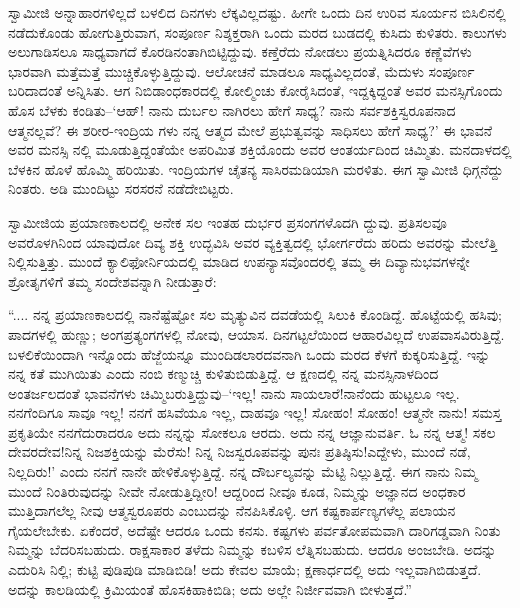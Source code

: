 ಸ್ವಾಮೀಜಿ ಅನ್ನಾಹಾರಗಳಿಲ್ಲದೆ ಬಳಲಿದ ದಿನಗಳು ಲೆಕ್ಕವಿಲ್ಲದಷ್ಟು. ಹೀಗೇ ಒಂದು ದಿನ ಉರಿವ ಸೂರ್ಯನ ಬಿಸಿಲಿನಲ್ಲಿ ನಡೆದುಕೊಂಡು ಹೋಗುತ್ತಿರುವಾಗ, ಸಂಪೂರ್ಣ ನಿಶ್ಶಕ್ತರಾಗಿ ಒಂದು ಮರದ ಬುಡದಲ್ಲಿ ಕುಸಿದು ಕುಳಿತರು. ಕಾಲುಗಳು ಅಲುಗಾಡಿಸಲೂ ಸಾಧ್ಯವಾಗದೆ ಕೊರಡಿನಂತಾಗಿಬಿಟ್ಟಿದ್ದುವು. ಕಣ್ತೆರೆದು ನೋಡಲು ಪ್ರಯತ್ನಿಸಿದರೂ ಕಣ್ಣೆವೆಗಳು ಭಾರವಾಗಿ ಮತ್ತೆಮತ್ತೆ ಮುಚ್ಚಿಕೊಳ್ಳುತ್ತಿದ್ದುವು. ಆಲೋಚನೆ ಮಾಡಲೂ ಸಾಧ್ಯವಿಲ್ಲದಂತೆ, ಮೆದುಳು ಸಂಪೂರ್ಣ ಬರಿದಾದಂತೆ ಅನ್ನಿಸಿತು. ಆಗ ನಿಬಿಡಾಂಧಕಾರದಲ್ಲಿ ಕೋಲ್ಮಿಂಚು ಕೋರೈಸಿದಂತೆ, ಇದ್ದಕ್ಕಿದ್ದಂತೆ ಅವರ ಮನಸ್ಸಿಗೊಂದು ಹೊಸ ಬೆಳಕು ಕಂಡಿತು–‘ಆಹ್! ನಾನು ದುರ್ಬಲ ನಾಗಿರಲು ಹೇಗೆ ಸಾಧ್ಯ? ನಾನು ಸರ್ವಶಕ್ತಿಸ್ವರೂಪನಾದ ಆತ್ಮನಲ್ಲವೆ? ಈ ಶರೀರ-ಇಂದ್ರಿಯ ಗಳು ನನ್ನ ಆತ್ಮದ ಮೇಲೆ ಪ್ರಭುತ್ವವನ್ನು ಸಾಧಿಸಲು ಹೇಗೆ ಸಾಧ್ಯ?’ ಈ ಭಾವನೆ ಅವರ ಮನಸ್ಸಿ ನಲ್ಲಿ ಮೂಡುತ್ತಿದ್ದಂತೆಯೇ ಅಪರಿಮಿತ ಶಕ್ತಿಯೊಂದು ಅವರ ಆಂತರ್ಯದಿಂದ ಚಿಮ್ಮಿತು. ಮನದಾಳದಲ್ಲಿ ಬೆಳಕಿನ ಹೊಳೆ ಹೊಮ್ಮಿ ಹರಿಯಿತು. ಇಂದ್ರಿಯಗಳ ಚೈತನ್ಯ ಸಾಸಿರಮಡಿಯಾಗಿ ಮರಳಿತು. ಈಗ ಸ್ವಾಮೀಜಿ ಧಿಗ್ಗನೆದ್ದು ನಿಂತರು. ಅಡಿ ಮುಂದಿಟ್ಟು ಸರಸರನೆ ನಡೆದೇಬಿಟ್ಟರು.

ಸ್ವಾಮೀಜಿಯ ಪ್ರಯಾಣಕಾಲದಲ್ಲಿ ಅನೇಕ ಸಲ ಇಂತಹ ದುರ್ಭರ ಪ್ರಸಂಗಗಳೊದಗಿ ದ್ದುವು. ಪ್ರತಿಸಲವೂ ಅವರೊಳಗಿನಿಂದ ಯಾವುದೋ ದಿವ್ಯ ಶಕ್ತಿ ಉದ್ಭವಿಸಿ ಅವರ ವ್ಯಕ್ತಿತ್ವದಲ್ಲಿ ಭೋರ್ಗರೆದು ಹರಿದು ಅವರನ್ನು ಮೇಲೆತ್ತಿ ನಿಲ್ಲಿಸುತ್ತಿತ್ತು. ಮುಂದೆ ಕ್ಯಾಲಿಫೋರ್ನಿಯದಲ್ಲಿ ಮಾಡಿದ ಉಪನ್ಯಾಸವೊಂದರಲ್ಲಿ ತಮ್ಮ ಈ ದಿವ್ಯಾನುಭವಗಳನ್ನೇ ಶ್ರೋತೃಗಳಿಗೆ ತಮ್ಮ ಸಂದೇಶವನ್ನಾಗಿ ನೀಡುತ್ತಾರೆ:

“.... ನನ್ನ ಪ್ರಯಾಣಕಾಲದಲ್ಲಿ ನಾನೆಷ್ಟೆಷ್ಟೋ ಸಲ ಮೃತ್ಯುವಿನ ದವಡೆಯಲ್ಲಿ ಸಿಲುಕಿ ಕೊಂಡಿದ್ದೆ. ಹೊಟ್ಟೆಯಲ್ಲಿ ಹಸಿವು; ಪಾದಗಳಲ್ಲಿ ಹುಣ್ಣು; ಅಂಗಪ್ರತ್ಯಂಗಗಳಲ್ಲಿ ನೋವು, ಆಯಾಸ. ದಿನಗಟ್ಟಲೆಯಿಂದ ಆಹಾರವಿಲ್ಲದೆ ಉಪವಾಸವಿರುತ್ತಿದ್ದೆ. ಬಳಲಿಕೆಯಿಂದಾಗಿ ಇನ್ನೊಂದು ಹೆಜ್ಜೆಯನ್ನೂ ಮುಂದಿಡಲಾರದವನಾಗಿ ಒಂದು ಮರದ ಕೆಳಗೆ ಕುಕ್ಕರಿಸುತ್ತಿದ್ದೆ. ಇನ್ನು ನನ್ನ ಕತೆ ಮುಗಿಯಿತು ಎಂದು ನಂಬಿ ಕಣ್ಮುಚ್ಚಿ ಕುಳಿತುಬಿಡುತ್ತಿದ್ದೆ. ಆ ಕ್ಷಣದಲ್ಲಿ ನನ್ನ ಮನಸ್ಸಿನಾಳದಿಂದ ಅಂತರ್ಜಲದಂತೆ ಭಾವನೆಗಳು ಚಿಮ್ಮಿಬರುತ್ತಿದ್ದುವು–‘ಇಲ್ಲ! ನಾನು ಸಾಯಲಾರೆ!ನಾನೆಂದು ಹುಟ್ಟಲೂ ಇಲ್ಲ. ನನಗೆಂದಿಗೂ ಸಾವೂ ಇಲ್ಲ! ನನಗೆ ಹಸಿವೆಯೂ ಇಲ್ಲ, ದಾಹವೂ ಇಲ್ಲ! ಸೋಹಂ! ಸೋಹಂ! ಆತ್ಮನೇ ನಾನು! ಸಮಸ್ತ ಪ್ರಕೃತಿಯೇ ನನಗೆದುರಾದರೂ ಅದು ನನ್ನನ್ನು ಸೋಕಲೂ ಆರದು. ಅದು ನನ್ನ ಆಜ್ಞಾನುವರ್ತಿ. ಓ ನನ್ನ ಆತ್ಮ! ಸಕಲ ದೇವರದೇವ!ನಿನ್ನ ನಿಜಶಕ್ತಿಯನ್ನು ಮೆರೆಸು! ನಿನ್ನ ನಿಜಸ್ವರೂಪವನ್ನು ಪುನಃ ಪ್ರತಿಷ್ಠಿಸು!ಎದ್ದೇಳು, ಮುಂದೆ ನಡೆ, ನಿಲ್ಲದಿರು!’ ಎಂದು ನನಗೆ ನಾನೇ ಹೇಳಿಕೊಳ್ಳುತ್ತಿದ್ದೆ. ನನ್ನ ದೌರ್ಬಲ್ಯವನ್ನು ಮೆಟ್ಟಿ ನಿಲ್ಲುತ್ತಿದ್ದೆ. ಈಗ ನಾನು ನಿಮ್ಮ ಮುಂದೆ ನಿಂತಿರುವುದನ್ನು ನೀವೇ ನೋಡುತ್ತಿದ್ದೀರಿ! ಆದ್ದರಿಂದ ನೀವೂ ಕೂಡ, ನಿಮ್ಮನ್ನು ಅಜ್ಞಾನದ ಅಂಧಕಾರ ಮುತ್ತಿದಾಗಲೆಲ್ಲ ನೀವು ಆತ್ಮಸ್ವರೂಪರು ಎಂಬುದನ್ನು ನೆನಪಿಸಿಕೊಳ್ಳಿ. ಆಗ ಕಷ್ಟಕಾರ್ಪಣ್ಯಗಳೆಲ್ಲ ಪಲಾಯನ ಗೈಯಲೇಬೇಕು. ಏಕೆಂದರೆ, ಅದೆಷ್ಟೇ ಆದರೂ ಒಂದು ಕನಸು. ಕಷ್ಟಗಳು ಪರ್ವತೋಪಮವಾಗಿ ದಾರಿಗಡ್ಡವಾಗಿ ನಿಂತು ನಿಮ್ಮನ್ನು ಬೆದರಿಸಬಹುದು. ರಾಕ್ಷಸಾಕಾರ ತಳೆದು ನಿಮ್ಮನ್ನು ಕಬಳಿಸ ಲೆತ್ನಿಸಬಹುದು. ಆದರೂ ಅಂಜಬೇಡಿ. ಅದನ್ನು ಎದುರಿಸಿ ನಿಲ್ಲಿ; ಕುಟ್ಟಿ ಪುಡಿಪುಡಿ ಮಾಡಿಬಿಡಿ! ಅದು ಕೇವಲ ಮಾಯೆ; ಕ್ಷಣಾರ್ಧದಲ್ಲಿ ಅದು ಇಲ್ಲವಾಗಿಬಿಡುತ್ತದೆ. ಅದನ್ನು ಕಾಲಡಿಯಲ್ಲಿ ಕ್ರಿಮಿಯಂತೆ ಹೊಸಕಿಹಾಕಿಬಿಡಿ; ಅದು ಅಲ್ಲೇ ನಿರ್ಜೀವವಾಗಿ ಬೀಳುತ್ತದೆ.”

